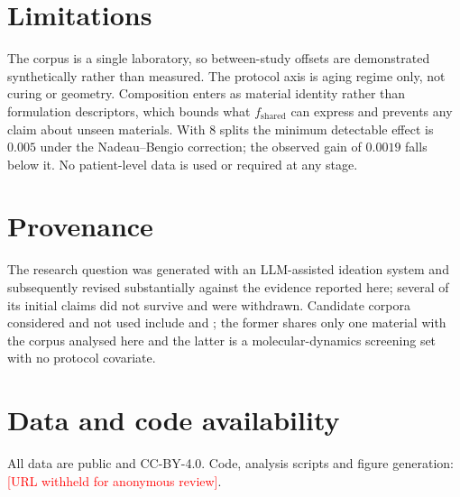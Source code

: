 \documentclass[11pt]{article}
\begin{document}
\section{Limitations}

The corpus is a single laboratory, so between-study offsets are demonstrated
synthetically rather than measured. The protocol axis is aging regime only, not
curing or geometry. Composition enters as material identity rather than
formulation descriptors, which bounds what $f_{\mathrm{shared}}$ can express
and prevents any claim about unseen materials. With 8 splits the minimum
detectable effect is $0.005$ under the Nadeau--Bengio correction; the observed
gain of $0.0019$ falls below it. No patient-level data is used or required at
any stage.

\section*{Provenance}
The research question was generated with an LLM-assisted ideation system
\citep{garikaparthi2025iris} and subsequently revised substantially against the
evidence reported here; several of its initial claims did not survive and were
withdrawn. Candidate corpora considered and not used include
\citet{domarecka2021data} and \citet{balantrapu2026elokriti}; the former shares
only one material with the corpus analysed here and the latter is a
molecular-dynamics screening set with no protocol covariate.

\section*{Data and code availability}
All data are public and CC-BY-4.0. Code, analysis scripts and figure
generation: \textcolor{red}{[URL withheld for anonymous review]}.



\end{document}
